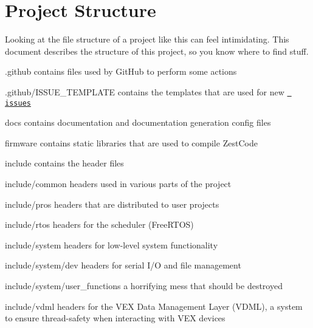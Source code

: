 \chapter{Project Structure}
\hypertarget{md__s_t_r_u_c_t_u_r_e}{}\label{md__s_t_r_u_c_t_u_r_e}
\label{md__s_t_r_u_c_t_u_r_e_autotoc_md12}%
%


Looking at the file structure of a project like this can feel intimidating. This document describes the structure of this project, so you know where to find stuff.


\begin{DoxyItemize}
\item {\ttfamily .github} contains files used by Git\+Hub to perform some actions
\begin{DoxyItemize}
\item {\ttfamily .github/\+ISSUE\+\_\+\+TEMPLATE} contains the templates that are used for new \href{https://github.com/ZestCommunity/ZestCode/issues}{\texttt{ issues}}
\end{DoxyItemize}
\item {\ttfamily docs} contains documentation and documentation generation config files
\item {\ttfamily firmware} contains static libraries that are used to compile Zest\+Code
\item {\ttfamily include} contains the header files
\begin{DoxyItemize}
\item {\ttfamily include/common} headers used in various parts of the project
\item {\ttfamily include/pros} headers that are distributed to user projects
\item {\ttfamily include/rtos} headers for the scheduler (Free\+RTOS)
\item {\ttfamily include/system} headers for low-\/level system functionality
\begin{DoxyItemize}
\item {\ttfamily include/system/dev} headers for serial I/O and file management
\item {\ttfamily include/system/user\+\_\+functions} a horrifying mess that should be destroyed
\end{DoxyItemize}
\item {\ttfamily include/vdml} headers for the VEX Data Management Layer (VDML), a system to ensure thread-\/safety when interacting with VEX devices
\end{DoxyItemize}

\end{DoxyItemize}
